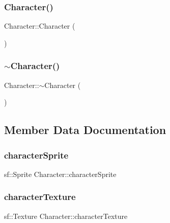 \subsubsection{\texorpdfstring{Character()}{Character()}}
{\footnotesize\ttfamily Character\+::\+Character (\begin{DoxyParamCaption}{ }\end{DoxyParamCaption})}

\mbox{\label{class_character_a9e9be564d05ded80962b2045aa70b3fc}} 
\subsubsection{\texorpdfstring{$\sim$\+Character()}{~Character()}}
{\footnotesize\ttfamily Character\+::$\sim$\+Character (\begin{DoxyParamCaption}{ }\end{DoxyParamCaption})}



\subsection{Member Data Documentation}
\mbox{\label{class_character_af726b53a176ba8032e3a0ad28a11868c}} 
\subsubsection{\texorpdfstring{character\+Sprite}{characterSprite}}
{\footnotesize\ttfamily sf\+::\+Sprite Character\+::character\+Sprite}

\mbox{\label{class_character_a3880f38149ee17393273212aba865a5e}} 
\subsubsection{\texorpdfstring{character\+Texture}{characterTexture}}
{\footnotesize\ttfamily sf\+::\+Texture Character\+::character\+Texture}

